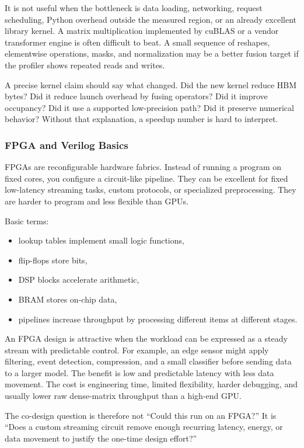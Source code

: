 It is not useful when the bottleneck is data loading, networking, request scheduling, Python overhead outside the measured region, or an already excellent library kernel. A matrix multiplication implemented by cuBLAS or a vendor transformer engine is often difficult to beat. A small sequence of reshapes, elementwise operations, masks, and normalization may be a better fusion target if the profiler shows repeated reads and writes.

A precise kernel claim should say what changed. Did the new kernel reduce HBM bytes? Did it reduce launch overhead by fusing operators? Did it improve occupancy? Did it use a supported low-precision path? Did it preserve numerical behavior? Without that explanation, a speedup number is hard to interpret.

\subsubsection{FPGA and Verilog Basics}

FPGAs are reconfigurable hardware fabrics. Instead of running a program on fixed cores, you configure a circuit-like pipeline. They can be excellent for fixed low-latency streaming tasks, custom protocols, or specialized preprocessing. They are harder to program and less flexible than GPUs.

Basic terms:

\begin{itemize}[leftmargin=*]
  \item lookup tables implement small logic functions,
  \item flip-flops store bits,
  \item DSP blocks accelerate arithmetic,
  \item BRAM stores on-chip data,
  \item pipelines increase throughput by processing different items at different stages.
\end{itemize}

An FPGA design is attractive when the workload can be expressed as a steady stream with predictable control. For example, an edge sensor might apply filtering, event detection, compression, and a small classifier before sending data to a larger model. The benefit is low and predictable latency with less data movement. The cost is engineering time, limited flexibility, harder debugging, and usually lower raw dense-matrix throughput than a high-end GPU.

The co-design question is therefore not ``Could this run on an FPGA?'' It is ``Does a custom streaming circuit remove enough recurring latency, energy, or data movement to justify the one-time design effort?''

